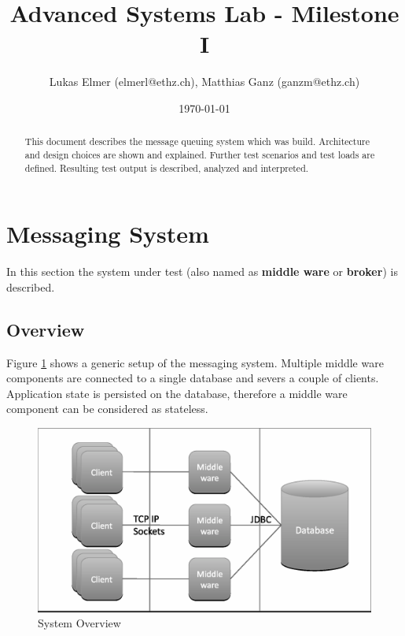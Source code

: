 \documentclass[a4paper]{article}
\title{Advanced Systems Lab - Milestone I}
\author{Lukas Elmer (elmerl@ethz.ch), Matthias Ganz (ganzm@ethz.ch)}
\date{\today}
\begin{document}
\maketitle

\pagebreak

\tableofcontents

\pagebreak

\begin{abstract}

This document describes the message queuing system which was build. Architecture and design choices are shown and explained. Further test scenarios and test loads are defined. Resulting test output is described, analyzed and interpreted.

\end{abstract}

\pagebreak

\section{Messaging System}
In this section the system under test (also named as \textbf{middle ware}  or \textbf{broker}) is described.


\subsection{Overview}

Figure \ref{fig:system-overview} shows a generic setup of the messaging system. Multiple middle ware components are connected to a single database and severs a couple of clients. Application state is persisted on the database, therefore a middle ware component can be considered as stateless.



\begin{figure}[H]
  \begin{center}
    \includegraphics[scale=0.5]{../drawings/system-overview.eps}
  \end{center}
  \caption{System Overview}
  \label{fig:system-overview}
\end{figure}
\end{document}
